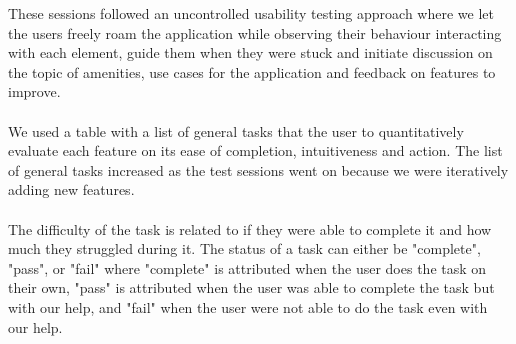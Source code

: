 These sessions followed an uncontrolled usability testing approach where we let the users freely roam the application while observing their behaviour interacting with each element, guide them when they were stuck and initiate discussion on the topic of amenities, use cases for the application and feedback on features to improve.\\\\
We used a table with a list of general tasks that the user to quantitatively evaluate each feature on its ease of completion, intuitiveness and action. The list of general tasks increased as the test sessions went on because we were iteratively adding new features.\\\\
The difficulty of the task is related to if they were able to complete it and how much they struggled during it. The status of a task can either be "complete", "pass", or "fail" where "complete" is attributed when the user does the task on their own, "pass" is attributed when the user was able to complete the task but with our help, and "fail" when the user were not able to do the task even with our help. \\\\

\newpage
